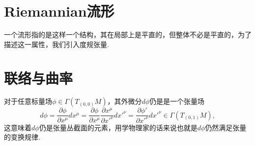 	\section{Riemannian流形}\label{sec:Riemannian_Manifold}
		一个流形指的是这样一个结构，其在局部上是平直的，但整体不必是平直的，为了描述这一属性，我们引入度规张量.


	\section{联络与曲率}
		对于任意标量场$\phi\in \varGamma(T_{(0,0)}M)$，其外微分$d\phi$仍是是一个张量场
		\begin{equation}
				 d\phi=\frac{\partial\phi}{\partial x^\mu}dx^\mu=\frac{\partial\phi}{\partial {x}^\mu}\frac{\partial{x}^\mu}{\partial {x'}^\nu}d{x'}^\nu=\frac{\partial{\phi'}}{\partial {x'}^\nu}d{x'}^\nu\in \varGamma(T_{(0,1)}M),
		\end{equation}
		这意味着$d\phi$仍是张量丛截面的元素，用学物理家的话来说也就是$d\phi$仍然满足张量的变换规律.
		

